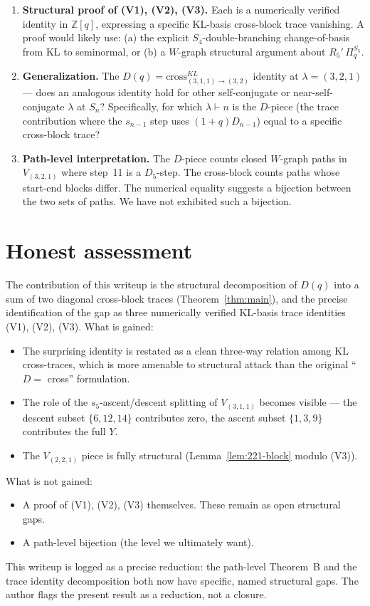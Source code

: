 \documentclass[11pt]{article}
\theoremstyle{definition}
\begin{document}
\begin{enumerate}[leftmargin=2em,topsep=0.3em,itemsep=0.3em]

\item \textbf{Structural proof of (V1), (V2), (V3).} Each is a numerically verified
identity in $\mathbb{Z}[q]$, expressing a specific KL-basis cross-block trace
vanishing. A proof would likely use: (a) the explicit $S_4$-double-branching
change-of-basis from KL to seminormal, or (b) a $W$-graph structural argument
about $R_5'\,\Pi_q^{S_5}$.

\item \textbf{Generalization.} The $D(q) = \mathrm{cross}_{(3,1,1)\to(3,2)}^{KL}$
identity at $\lambda = (3,2,1)$ — does an analogous identity hold for other
self-conjugate or near-self-conjugate $\lambda$ at $S_n$? Specifically, for which
$\lambda \vdash n$ is the $D$-piece (the trace contribution where the
$s_{n-1}$ step uses $(1+q) D_{n-1}$) equal to a specific cross-block trace?

\item \textbf{Path-level interpretation.} The $D$-piece counts closed
$W$-graph paths in $V_{(3,2,1)}$ where step~11 is a $D_5$-step. The cross-block
counts paths whose start-end blocks differ. The numerical equality suggests a
bijection between the two sets of paths. We have not exhibited such a bijection.

\end{enumerate}

\section*{Honest assessment}

The contribution of this writeup is the structural decomposition of $D(q)$ into a
sum of two diagonal cross-block traces (Theorem~\ref{thm:main}), and the precise
identification of the gap as three numerically verified KL-basis trace identities
(V1), (V2), (V3). What is gained:
\begin{itemize}[leftmargin=2em,topsep=0.2em,itemsep=0.1em]
\item The surprising identity is restated as a clean three-way relation among
KL cross-traces, which is more amenable to structural attack than the original
``$D = $ cross'' formulation.
\item The role of the $s_5$-ascent/descent splitting of $V_{(3,1,1)}$ becomes
visible — the descent subset $\{6, 12, 14\}$ contributes zero, the ascent
subset $\{1, 3, 9\}$ contributes the full $Y$.
\item The $V_{(2,2,1)}$ piece is fully structural (Lemma~\ref{lem:221-block}
modulo (V3)).
\end{itemize}
What is not gained:
\begin{itemize}[leftmargin=2em,topsep=0.2em,itemsep=0.1em]
\item A proof of (V1), (V2), (V3) themselves. These remain as open structural
gaps.
\item A path-level bijection (the level we ultimately want).
\end{itemize}

\medskip\noindent
This writeup is logged as a precise reduction: the path-level Theorem~B and the
trace identity decomposition both now have specific, named structural gaps. The
author flags the present result as a reduction, not a closure.
\end{document}
